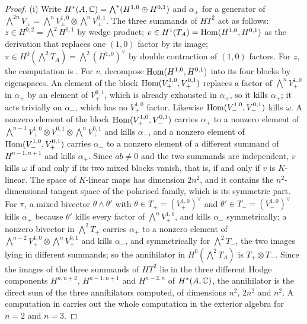 \begin{proof}
(i) Write $H^{*}(A,\mathbb{C})=\bigwedge^{*}(H^{1,0}\oplus H^{0,1})$ and
$\alpha_{\pm}$ for a generator of $\bigwedge^{2n}V_{\pm}
=\bigwedge^{n}V_{\pm}^{1,0}\otimes\bigwedge^{n}V_{\pm}^{0,1}$. The three
summands of $HT^{2}$ act as follows: $z\in H^{0,2}=\bigwedge^{2}H^{0,1}$ by
wedge product; $v\in H^{1}(T_{A})=\operatorname{Hom}(H^{1,0},H^{0,1})$ as the derivation
that replaces one $(1,0)$ factor by its image; $\pi\in H^{0}(\bigwedge^{2}T_{A})
=\bigwedge^{2}(H^{1,0})^{\vee}$ by double contraction of $(1,0)$ factors. For
$z$, the computation is . For $v$, decompose
$\operatorname{Hom}(H^{1,0},H^{0,1})$ into its four blocks by eigenspaces. An element of
the block $\operatorname{Hom}(V_{+}^{1,0},V_{+}^{0,1})$ replaces a factor of
$\bigwedge^{n}V_{+}^{1,0}$ in $\alpha_{+}$ by an element of $V_{+}^{0,1}$,
which is already exhausted in $\alpha_{+}$, so it kills $\alpha_{+}$; it acts
trivially on $\alpha_{-}$,
which has no $V_{+}^{1,0}$ factor. Likewise $\operatorname{Hom}(V_{-}^{1,0},V_{-}^{0,1})$
kills $\omega$. A nonzero element of the block $\operatorname{Hom}(V_{+}^{1,0},V_{-}^{0,1})$
carries $\alpha_{+}$ to a nonzero element of
$\bigwedge^{n-1}V_{+}^{1,0}\otimes V_{-}^{0,1}\otimes\bigwedge^{n}V_{+}^{0,1}$
and kills $\alpha_{-}$, and a nonzero element of $\operatorname{Hom}(V_{-}^{1,0},V_{+}^{0,1})$
carries $\alpha_{-}$ to a nonzero element of a different summand of
$H^{n-1,n+1}$ and kills $\alpha_{+}$. Since $ab\ne0$ and the two summands are
independent, $v$ kills $\omega$ if and only if its two mixed blocks vanish,
that is, if and only if $v$ is $K$-linear. The space of $K$-linear maps has
dimension $2n^{2}$, and it contains the $n^{2}$-dimensional tangent space of
the polarised family, which is its symmetric part. For $\pi$, a mixed
bivector $\theta\wedge\theta'$ with $\theta\in T_{+}=(V_{+}^{1,0})^{\vee}$ and
$\theta'\in T_{-}=(V_{-}^{1,0})^{\vee}$ kills $\alpha_{+}$ because $\theta'$
kills every factor of $\bigwedge^{n}V_{+}^{1,0}$, and kills $\alpha_{-}$
symmetrically; a nonzero bivector in $\bigwedge^{2}T_{+}$ carries $\alpha_{+}$
to a nonzero element of $\bigwedge^{n-2}V_{+}^{1,0}\otimes\bigwedge^{n}V_{+}^{0,1}$
and kills $\alpha_{-}$, and symmetrically for $\bigwedge^{2}T_{-}$, the two
images lying in different summands; so the annihilator in
$H^{0}(\bigwedge^{2}T_{A})$ is $T_{+}\otimes T_{-}$. Since the images of the
three summands of $HT^{2}$ lie in the three different Hodge components
$H^{n,n+2}$, $H^{n-1,n+1}$ and $H^{n-2,n}$ of $H^{*}(A,\mathbb{C})$, the annihilator
is the direct sum of the three annihilators computed, of dimensions $n^{2}$,
$2n^{2}$ and $n^{2}$. A computation in \cite{BMB26} carries out the
whole computation in the exterior algebra for $n=2$ and $n=3$.


\end{proof}
